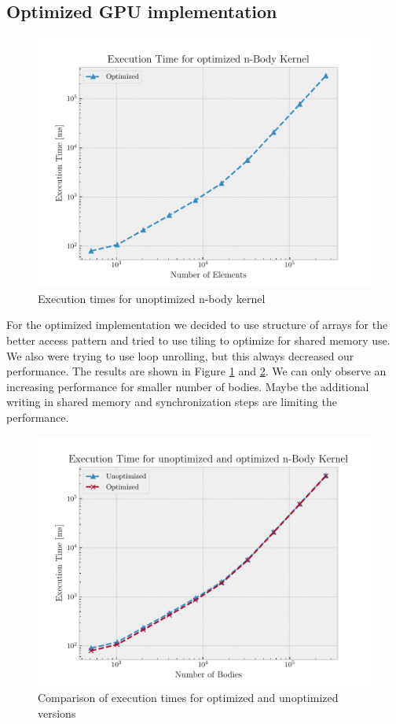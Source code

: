 \documentclass[12pt]{article}
\begin{document}
\subsection{Optimized GPU implementation}
\begin{figure}[H]
	\centering
	\includegraphics[width=0.9\linewidth]{./plot/time_vs_elems_opt.pdf}
	\caption{Execution times for unoptimized n-body kernel}%
	\label{fig:time_vs_elems_opt}
\end{figure}
For the optimized implementation we decided to use structure of arrays for the better access pattern and tried to use tiling to optimize for shared memory use. We also were trying to use loop unrolling, but this always decreased our performance. The results are shown in Figure \ref{fig:time_vs_elems_opt} and \ref{fig:time_vs_elems_both}. We can only observe an increasing performance for smaller number of bodies. Maybe the additional writing in shared memory and synchronization steps are limiting the performance.

\begin{figure}[H]
	\centering
	\includegraphics[width=0.9\linewidth]{./plot/time_vs_elems_both.pdf}
	\caption{Comparison of execution times for optimized and unoptimized versions}%
	\label{fig:time_vs_elems_both}
\end{figure}
\end{document}
